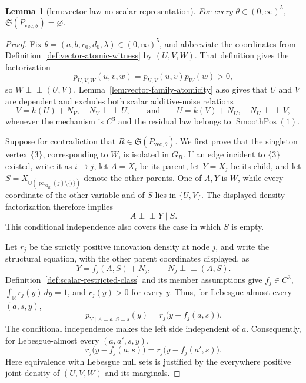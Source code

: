 \documentclass{article}
\newtheorem{lemma}{Lemma}
\begin{document}
\begin{lemma}[lem:vector-law-no-scalar-representation]\label{lem:vector-law-no-scalar-representation}
For every \(\theta\in(0,\infty)^5\), \(\mathfrak S(P_{\mathrm{vec},\theta})=\varnothing\).
\end{lemma}
\begin{proof}
Fix \(\theta=(a,b,c_0,d_0,\lambda)\in(0,\infty)^5\), and abbreviate the coordinates from Definition~\ref{def:vector-atomic-witness} by \((U,V,W)\).  That definition gives the factorization
\[
 p_{U,V,W}(u,v,w)=p_{U,V}(u,v)p_W(w)>0,
\]
so \(W\perp\!\!\!\perp(U,V)\).  Lemma~\ref{lem:vector-family-atomicity} also gives that \(U\) and \(V\) are dependent and excludes both scalar additive-noise relations
\[
 V=h(U)+N_V,\quad N_V\perp\!\!\!\perp U,
 \qquad\text{and}\qquad
 U=k(V)+N_U,\quad N_U\perp\!\!\!\perp V,
\]
whenever the mechanism is \(C^3\) and the residual law belongs to \(\operatorname{SmoothPos}(1)\).

Suppose for contradiction that \(R\in\mathfrak S(P_{\mathrm{vec},\theta})\).  We first prove that the singleton vertex \(\{3\}\), corresponding to \(W\), is isolated in \(G_R\).  If an edge incident to \(\{3\}\) existed, write it as \(i\to j\), let \(A=X_i\) be its parent, let \(Y=X_j\) be its child, and let \(S=X_{\cup(\operatorname{pa}_{G_R}(j)\setminus\{i\})}\) denote the other parents.  One of \(A,Y\) is \(W\), while every coordinate of the other variable and of \(S\) lies in \(\{U,V\}\).  The displayed density factorization therefore implies
\[
 A\perp\!\!\!\perp Y\mid S.
\]
This conditional independence also covers the case in which \(S\) is empty.

Let \(r_j\) be the strictly positive innovation density at node \(j\), and write the structural equation, with the other parent coordinates displayed, as
\[
 Y=f_j(A,S)+N_j,
 \qquad N_j\perp\!\!\!\perp(A,S).
\]
Definition~\ref{def:scalar-restricted-class} and its member assumptions give \(f_j\in C^3\), \(\int_{\mathbb R}r_j(y)\,dy=1\), and \(r_j(y)>0\) for every \(y\).  Thus, for Lebesgue-almost every \((a,s,y)\),
\[
 p_{Y\mid A=a,S=s}(y)=r_j\bigl(y-f_j(a,s)\bigr).
\]
The conditional independence makes the left side independent of \(a\).  Consequently, for Lebesgue-almost every \((a,a',s,y)\),
\[
 r_j\bigl(y-f_j(a,s)\bigr)
 =r_j\bigl(y-f_j(a',s)\bigr).
\]
Here equivalence with Lebesgue null sets is justified by the everywhere positive joint density of \((U,V,W)\) and its marginals.


\end{proof}
\end{document}
